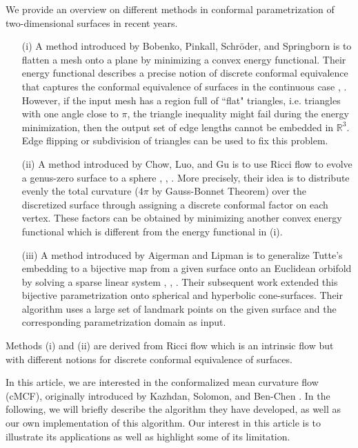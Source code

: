 \documentclass[11pt]{amsart}
\begin{document}
We provide an overview on different methods in conformal parametrization of two-dimensional surfaces in recent years. 
\begin{enumerate}
\item[(i)] A method introduced by Bobenko, Pinkall, Schr\"{o}der, and Springborn is to flatten a mesh onto a plane by minimizing a convex energy functional. Their energy functional describes a precise notion of discrete conformal equivalence that captures the conformal equivalence of surfaces in the continuous case \cite{bps}, \cite{ssp}. However, if the input mesh has a region full of ``flat" triangles, i.e. triangles with one angle close to $\pi$, the triangle inequality might fail during the energy minimization, then the output set of edge lengths cannot be embedded in $\mathbb{R}^3$. Edge flipping or subdivision of triangles can be used to fix this problem. 
\item[(ii)] A method introduced by Chow, Luo, and Gu is to use Ricci flow to evolve a genus-zero surface to a sphere \cite{cl}, \cite{jklg}, \cite{zzglg}. More precisely, their idea is to distribute evenly the total curvature  ($4\pi$ by Gauss-Bonnet Theorem) over the discretized surface through assigning a discrete conformal factor on each vertex. These factors can be obtained by minimizing another convex energy functional which is different from the energy functional in (i). 
\item[(iii)] A method introduced by Aigerman and Lipman is to generalize Tutte's embedding to a bijective map from a given surface onto an Euclidean orbifold by solving a sparse linear system \cite{al2}, \cite{al0}, \cite{al1}. Their subsequent work extended this bijective parametrization onto spherical and hyperbolic cone-surfaces. Their algorithm uses a large set of landmark points on the given surface and the corresponding parametrization domain as input.
\end{enumerate}
\vskip 5pt
Methods (i) and (ii) are derived from Ricci flow which is an intrinsic flow but with different notions for discrete conformal equivalence of surfaces. 

\bigbreak

In this article, we are interested in the conformalized mean curvature flow (cMCF), originally introduced by Kazhdan, Solomon, and Ben-Chen \cite{ksbc}. In the following, we will briefly describe the algorithm they have developed, as well as our own implementation of this algorithm. Our interest in this article is to illustrate its applications as well as highlight some of its limitation.
\end{document}
